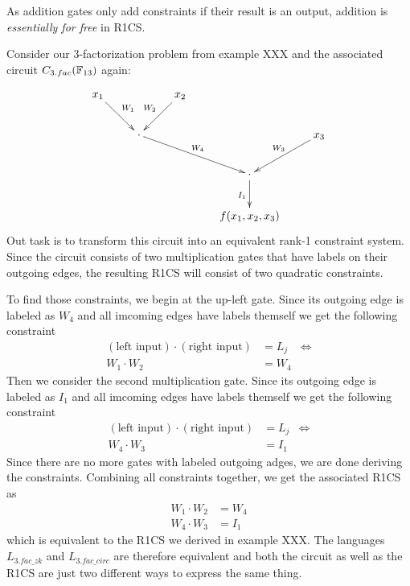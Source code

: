 As addition gates only add constraints if their result is an output, addition is \textit{essentially for free} in R1CS.
\begin{example}[$3$-factorization] Consider our $3$-factorization problem from example XXX and the associated circuit $C_{3.fac}(\mathbb{F}_{13})$ again:
 
\[
\xymatrix{x_1\ar^{W_1}[dr] &  & x_2\ar_{W_2}[dl]\\
 & \cdot \ar^{W_4}[drr] &   & & x_3\ar_{W_3}[dl]\\
  &  &  & \cdot\ar_{I_1}[d]\\
  &  &  & f(x_1,x_2,x_3)
}
\]
Out task is to transform this circuit into an equivalent rank-1 constraint system. Since the circuit consists of two multiplication gates that have labels on their outgoing edges, the resulting R1CS will consist of two quadratic constraints. 

To find those constraints, we begin at the up-left gate. Since its outgoing edge is labeled as $W_4$ and all imcoming edges have labels themself we get the following constraint
\begin{align*}
(\text{left input})\cdot (\text{right input})  &= L_j & \Leftrightarrow\\
W_1\cdot W_2  &= W_4
\end{align*}
Then we consider the second multiplication gate. Since its outgoing edge is labeled as $I_1$ and all imcoming edges have labels themself we get the following constraint
\begin{align*}
(\text{left input})\cdot (\text{right input})  &= L_j & \Leftrightarrow\\
W_4\cdot W_3  &= I_1
\end{align*}
Since there are no more gates with labeled outgoing adges, we are done deriving the constraints. Combining all constraints together, we get the associated R1CS as
\begin{align*}
 W_1\cdot W_2 & = W_4\\
 W_4\cdot W_3 & = I_1
\end{align*}
which is equivalent to the R1CS we derived in example XXX. The languages $L_{3.fac\_zk}$ and $L_{3.fac\_circ}$ are therefore equivalent and both the circuit as well as the R1CS are just two different ways to express the same thing.
\end{example}
